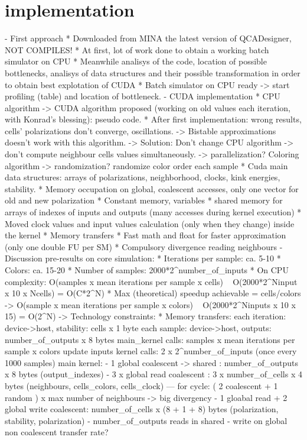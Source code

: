 \chapter{implementation}\label{sec:implementation}

- First approach
	* Downloaded from MINA the latest version of QCADesigner, NOT COMPILES!
	* At first, lot of work done to obtain a working batch simulator on CPU
	* Meanwhile analisys of the code, location of possible bottlenecks, analisys of data structures and their possible transformation in order to obtain best explotation of CUDA
	* Batch simulator on CPU ready -> start profiling (table) and location of bottleneck.
- CUDA implementation
	* CPU algorithm -> CUDA algorithm proposed (working on old values each iteration, with Konrad's blessing): pseudo code.
	* After first implementation: wrong results, cells' polarizations don't converge, oscillations.
	-> Bistable approximations doesn't work with this algorithm.
	-> Solution: Don't change CPU algorithm -> don't compute neighbour cells values simultaneously.
	-> parallelization? Coloring algorithm
	-> randomization? randomize color order each sample
	* Cuda main data structures: arrays of polarizations, neighborhood, clocks, kink energies, stability.
	* Memory occupation on global, coalescent accesses, only one vector for old and new polarization
	* Constant memory, variables
	* shared memory for arrays of indexes of inputs and outputs (many accesses during kernel execution)
	* Moved clock values and input values calculation (only when they change) inside the kernel
	* Memory transfers
	* Fast math and float for faster approximation (only one double FU per SM)
	* Compulsory divergence reading neighbours
- Discussion pre-results on core simulation:
	* Iterations per sample: ca. 5-10
	* Colors: ca. 15-20
	* Number of samples: 2000*2^number_of_inputs
	* On CPU complexity: O(samples x mean iterations per sample x cells) ~ O(2000*2^Ninput x 10 x Ncells) = O(C*2^N)
	* Max (theoretical) speedup achievable = cells/colors -> O(sample x mean iterations per sample x colors) ~ O(2000*2^Ninputs x 10 x 15) = O(2^N)
	-> Technology constraints:
	* Memory transfers:
		 each iteration: device->host, stability: cells x 1 byte
		 each sample: device->host, outputs: number_of_outputs x 8 bytes
		 main_kernel calls: samples x mean iterations per sample x colors
		 update inputs kernel calls: 2 x 2^number_of_inputs (once every 1000 samples)
		 main kernel:
			- 1 global coalescent -> shared : number_of_outputs x 8 bytes (output_indexes)
			- 3 x global read coalescent : 3 x number_of_cells x 4 bytes (neighbours, cells_colors, cells_clock)
			--- for cycle: ( 2 coalescent + 1 random ) x max number of neighbours -> big divergency
			- 1 gloabal read + 2 global write coalescent: number_of_cells x (8 + 1 + 8) bytes (polarization, stability, polarization)
			- number_of_outputs reads in shared
			- write on global non coalescent
		 transfer rate?
